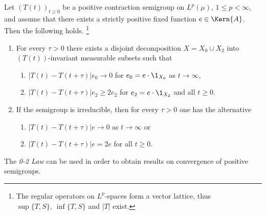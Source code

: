 \begin{theorem}\label{thm:c4-2.6}
%
%
Let $(T(t))_{t \geq 0}$ be a positive contraction semigroup on $L^{p}(\mu)$, $1 \leq p < \infty$, and assume that there exists a strictly positive fixed function $e \in \Kern{A}$. 
Then the following holds. 
\footnote{The regular operators on $L^p$-spaces form a vector lattice, thus $\sup\{T,S\},\ \inf\{T,S\}$ and $|T|$ exist.}
\begin{enumerate}[\upshape (i)]
\item \label{thm:c4-2.6-1}
For every $\tau > 0$ there exists a disjoint decomposition $X = X_{0} \cup X_{2}$ into $(T(t))$-invariant measurable subsets such that
\begin{enumerate}
    \item[(0)] \label{thm:c4-2.6-1.1} 
    $|T(t) - T(t+\tau)|e_{0} \to 0$ for $e_{0} = e \cdot \1_{X_{0}}$ as $t \to \infty$,
    \item[(2)] \label{thm:c4-2.6-1.2} 
    $|T(t) - T(t+\tau)|e_{2} \geq 2e_{2}$ for $e_{2} = e \cdot \1_{X_{2}}$ and all $t \geq 0$.
    \end{enumerate}

\item \label{thm:c4-2.6-2} 
If the semigroup is irreducible, then for every $\tau > 0$ one has the alternative
\begin{enumerate}
    \item[(0)] \label{thm:c4-2.6-2.1} 
    $|T(t) - T(t+\tau)|e \to 0$ as $t \to \infty$ or
    \item[(2)] \label{thm:c4-2.6-2.2} 
    $|T(t) - T(t+\tau)|e = 2e$ for all $t \geq 0$.
\end{enumerate}
\end{enumerate}
\end{theorem}
The \emph{0-2 Law} can be used in order to obtain results on convergence of positive semigroups.

